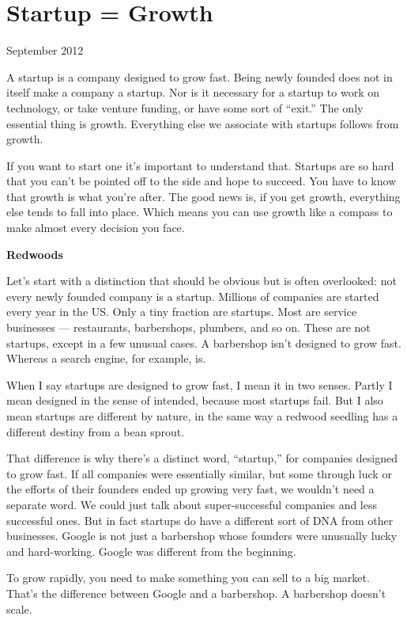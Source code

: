 \chapter{Startup = Growth}

September 2012

A startup is a company designed to grow fast. Being newly founded does
not in itself make a company a startup. Nor is it necessary for a
startup to work on technology, or take venture funding, or have some
sort of ``exit.'' The only essential thing is growth. Everything else we
associate with startups follows from growth.

If you want to start one it's important to understand that. Startups are
so hard that you can't be pointed off to the side and hope to succeed.
You have to know that growth is what you're after. The good news is, if
you get growth, everything else tends to fall into place. Which means
you can use growth like a compass to make almost every decision you
face.

\textbf{Redwoods}

Let's start with a distinction that should be obvious but is often
overlooked: not every newly founded company is a startup. Millions of
companies are started every year in the US. Only a tiny fraction are
startups. Most are service businesses --- restaurants, barbershops,
plumbers, and so on. These are not startups, except in a few unusual
cases. A barbershop isn't designed to grow fast. Whereas a search
engine, for example, is.

When I say startups are designed to grow fast, I mean it in two senses.
Partly I mean designed in the sense of intended, because most startups
fail. But I also mean startups are different by nature, in the same way
a redwood seedling has a different destiny from a bean sprout.

That difference is why there's a distinct word, ``startup,'' for
companies designed to grow fast. If all companies were essentially
similar, but some through luck or the efforts of their founders ended up
growing very fast, we wouldn't need a separate word. We could just talk
about super-successful companies and less successful ones. But in fact
startups do have a different sort of DNA from other businesses. Google
is not just a barbershop whose founders were unusually lucky and
hard-working. Google was different from the beginning.

To grow rapidly, you need to make something you can sell to a big
market. That's the difference between Google and a barbershop. A
barbershop doesn't scale.


